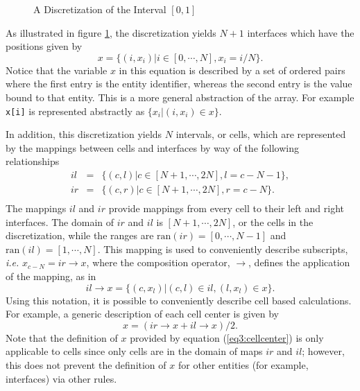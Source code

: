 \documentclass[10pt,epsf]{book}
\begin{document}
\begin{figure}[htbp]
 \centerline{
  \epsfxsize=5.50in
  }
 \caption{A Discretization of the Interval $[0,1]$}
 \label{fig3:oned}
\end{figure}

As illustrated in figure \ref{fig3:oned}, the discretization yields
$N+1$ interfaces which have the positions given by
\begin{equation}
x = \lbrace (i,x_i) | i \in [0, \cdots, N], x_i = i/N \rbrace.
\label{eq3:interfacex}
\end{equation}
Notice that the variable $x$ in this equation is described by a set of
ordered pairs where the first entry is the entity identifier, whereas
the second entry is the value bound to that entity.  This is a more
general abstraction of the array.  For example {\tt x[i]} is
represented abstractly as $\lbrace x_i | (i,x_i) \in x \rbrace$.

In addition, this discretization yields $N$ intervals, or cells, which
are represented by the mappings between cells and interfaces by way of
the following relationships
\begin{equation}
\begin{array}{rcl}
il & = & \lbrace (c,l) | c \in [N+1, \cdots, 2N], l = c-N-1 \rbrace,\\
ir & = & \lbrace (c,r) | c \in [N+1, \cdots, 2N], r = c-N \rbrace.\\
\end{array}
\label{eq3:cellmaps}
\end{equation}
The mappings $il$ and $ir$ provide mappings from every cell to their
left and right interfaces.  The domain of $ir$ and $il$ is $[N+1,
\cdots, 2N]$, or the cells in the discretization, while the ranges are
$\mathrm{ran}(ir) = [0, \cdots, N-1]$ and $\mathrm{ran}(il) = [1, \cdots, N]$.  This
mapping is used to conveniently describe subscripts, {\it i.e.}
$x_{c-N} = ir \rightarrow x$, where the composition operator,
$\rightarrow$, defines the application of the mapping, as in
\begin{equation}
il\rightarrow x = \lbrace (c,x_l) | (c,l) \in il, (l,x_l) \in x \rbrace.
\end{equation}
Using this notation, it is possible to conveniently describe cell
based calculations.  For example, a generic description of each cell
center is given by
\begin{equation}
\label{eq3:cellcenter}
x = (ir \rightarrow x + il \rightarrow x)/2.
\end{equation}
Note that the definition of $x$ provided by equation
(\ref{eq3:cellcenter}) is only applicable to cells since only cells are in
the domain of maps $ir$ and $il$; however, this does not prevent the
definition of $x$ for other entities (for example, interfaces) via
other rules.
\end{document}
